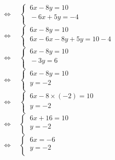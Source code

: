 \documentclass[a4paper,11pt,exos]{nsi}
\begin{document}
\begin{enumerate}
\begin{tabbing}
                \>  $\iff \quad \left\{
                    \begin{array}{l}
                    \ 6x-8y=10 \\
                    \ -6x+5y=-4 \\
                \end{array} \right.$\\[1em]

                \>  $\iff \quad \left\{
                    \begin{array}{l}
                    \ 6x-8y=10 \\
                    \ 6x-6x-8y+5y=10-4 \\
                \end{array} \right.$\\[1em]

                \>  $\iff \quad \left\{
                    \begin{array}{l}
                    \ 6x-8y=10 \\
                    \ -3y=6 \\
                \end{array} \right.$\\[1em]

                \>  $\iff \quad \left\{
                    \begin{array}{l}
                    \ 6x-8y=10 \\
                    \ y=-2 \\
                \end{array} \right.$\\[1em]

                \>  $\iff \quad \left\{
                    \begin{array}{l}
                    \ 6x-8\times(-2)=10 \\
                    \ y=-2 \\
                \end{array} \right.$\\[1em]

                \>  $\iff \quad \left\{
                    \begin{array}{l}
                    \ 6x+16=10 \\
                    \ y=-2 \\
                \end{array} \right.$\\[1em]

                \>  $\iff \quad \left\{
                    \begin{array}{l}
                    \ 6x=-6\\
                    \ y=-2 \\
                \end{array} \right.$\\[1em]


\end{tabbing}
\end{enumerate}
\end{document}
